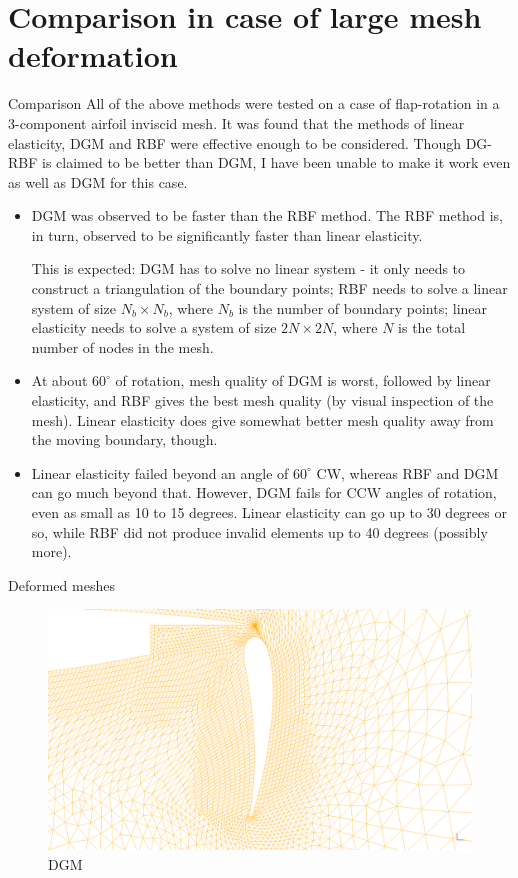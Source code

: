 \documentclass[mathserif]{beamer}
\begin{document}
\section{Comparison in case of large mesh deformation}
\begin{frame}[allowframebreaks]{Comparison}
All of the above methods were tested on a case of flap-rotation in a 3-component airfoil inviscid mesh. It was found that the methods of linear elasticity, DGM and RBF were effective enough to be considered. Though DG-RBF is claimed to be better than DGM, I have been unable to make it work even as well as DGM for this case.
\begin{itemize}
\item DGM was observed to be faster than the RBF method. The RBF method is, in turn, observed to be significantly faster than linear elasticity. 

This is expected: DGM has to solve no linear system - it only needs to construct a triangulation of the boundary points; RBF needs to solve a linear system of size $N_b \times N_b$, where $N_b$ is the number of boundary points; linear elasticity needs to solve a system of size $2N \times 2N$, where $N$ is the total number of nodes in the mesh. 

\item At about $60^\circ$ of rotation, mesh quality of DGM is worst, followed by linear elasticity, and RBF gives the best mesh quality (by visual inspection of the mesh). Linear elasticity does give somewhat better mesh quality away from the moving boundary, though.

\item Linear elasticity failed beyond an angle of $60^\circ$ CW, whereas RBF and DGM can go much beyond that. However, DGM fails for CCW angles of rotation, even as small as 10 to 15 degrees. Linear elasticity can go up to 30 degrees or so, while RBF did not produce invalid elements up to 40 degrees (possibly more).
\end{itemize}
\end{frame}

\begin{frame}{Deformed meshes}
\begin{figure}
\includegraphics[scale=0.18]{movedwing-dgm--60-2}
\caption{DGM}
\end{figure}
\end{frame}
\end{document}
